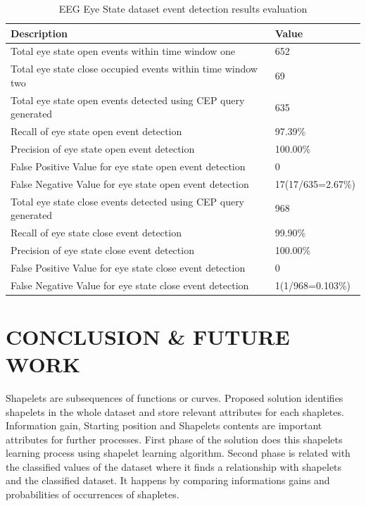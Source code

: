 \documentclass[conference]{IEEEtran}  %
\begin{document}
\begin{table}
\caption{EEG Eye State dataset event detection results evaluation}
\begin{center}
\begin{tabular}{ | m{6cm} | m{2.3cm}| } 
 \hline 
\textbf{Description} & \textbf{Value}\\
\hline
Total eye state open events within time window one & 652\\
\hline
Total eye state close occupied events within time window two & 69\\
\hline
Total eye state open events detected using CEP query generated & 635\\
\hline
Recall of eye state open event detection & 97.39\%\\
\hline
Precision of eye state open event detection & 100.00\%\\
\hline
False Positive Value for eye state open event detection & 0\\
\hline
False Negative Value for eye state open event detection & 17\newline(17/635=2.67\%)\\
\hline
Total eye state close events detected using CEP query generated & 968\\
\hline
Recall of eye state close event detection & 99.90\%\\
\hline
Precision of eye state close event detection & 100.00\%\\
\hline
False Positive Value for eye state close event detection & 0\\
\hline
False Negative Value for eye state close event detection & 1\newline(1/968=0.103\%)\\
\hline

\end{tabular}
\end{center}
\end{table}

\section{CONCLUSION \& FUTURE WORK}

Shapelets are subsequences of functions or curves. Proposed solution identifies shapelets in the whole dataset and store relevant attributes for each shapletes. Information gain, Starting position and Shapelets contents are important attributes for further processes. First phase of the solution does this shapelets learning process using shapelet learning algorithm. Second phase is related with the classified values of the dataset where it finds a relationship with shapelets and the classified dataset. It happens by comparing informations gains and probabilities of occurrences of shapletes. 
\end{document}
